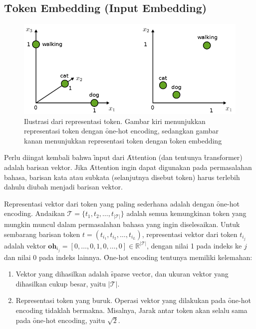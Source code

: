 	\subsection{\f{Token Embedding (Input Embedding)}}
	\label{sec:token-embedding}
	\begin{figure}
		\centering
		\includegraphics[width=1\textwidth]{assets/pics/token-embedding.png}
		\caption{Ilustrasi dari representasi token. Gambar kiri menunjukkan representasi token dengan \f{one-hot encoding}, sedangkan gambar kanan menunjukkan representasi token dengan \f{token embedding} \citep{geiger2022deeplearning}}
		\label{fig:token-embedding}
	\end{figure}
	Perlu diingat kembali bahwa \f{input} dari \f{Attention} (dan tentunya \f{transformer}) adalah barisan vektor. Jika \f{Attention} ingin dapat digunakan pada permasalahan bahasa, barisan kata atau subkata (selanjutnya disebut token) harus terlebih dahulu diubah menjadi barisan vektor.

	Representasi vektor dari token yang paling sederhana adalah dengan \f{one-hot encoding}. Andaikan $\mathcal{T} = \{t_1, t_2, \dots, t_{|\mathcal{T}|}\}$ adalah semua kemungkinan token yang mungkin muncul dalam permasalahan bahasa yang ingin diselesaikan. Untuk sembarang barisan token $t = (t_{i_1}, t_{i_2}, \dots, t_{i_L})$, representasi vektor dari token $t_{i_j}$ adalah vektor $\mathbf{oh}_{i_j} = [0, \dots, 0, 1, 0, \dots, 0] \in \mathbb{R}^{|\mathcal{T}|}$, dengan nilai 1 pada indeks ke $j$ dan nilai 0 pada indeks lainnya. \f{One-hot encoding} tentunya memiliki kelemahan:
	\begin{enumerate}
		\item Vektor yang dihasilkan adalah \f{sparse vector}, dan ukuran vektor yang dihasilkan cukup besar, yaitu $|\mathcal{T}|$.
		\item Representasi token yang buruk. Operasi vektor yang dilakukan pada \f{one-hot encoding} tidaklah bermakna. Misalnya, Jarak antar token akan selalu sama pada \f{one-hot encoding}, yaitu $\sqrt{2}$.
	\end{enumerate}

